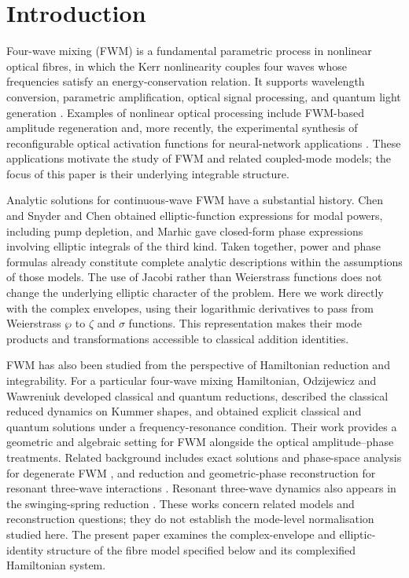 \documentclass[11pt,a4paper]{article}
\numberwithin{equation}{section}
\begin{document}
\section{Introduction}
Four-wave mixing (FWM) is a fundamental parametric process in nonlinear optical fibres, in which the Kerr nonlinearity couples four waves whose frequencies satisfy an energy-conservation relation.
It supports wavelength conversion, parametric amplification, optical signal processing, and quantum light generation \cite{agrawalNonlinearFiberOptics2019,marhicFiberOpticalParametric2007}.
Examples of nonlinear optical processing include FWM-based amplitude regeneration \cite{bottrillOptimisationAmplitudeLimiters2016} and, more recently, the experimental synthesis of reconfigurable optical activation functions for neural-network applications \cite{yangReconfigurableOpticalNonlinear2026}.
These applications motivate the study of FWM and related coupled-mode models; the focus of this paper is their underlying integrable structure.

Analytic solutions for continuous-wave FWM have a substantial history.
Chen and Snyder \cite{chenFourphotonParametricMixing1989} and Chen \cite{chenFourwaveMixingOptical1989} obtained elliptic-function expressions for modal powers, including pump depletion, and Marhic \cite{marhicAnalyticSolutionsPhases2013} gave closed-form phase expressions involving elliptic integrals of the third kind.
Taken together, power and phase formulas already constitute complete analytic descriptions within the assumptions of those models.
The use of Jacobi rather than Weierstrass functions does not change the underlying elliptic character of the problem.
Here we work directly with the complex envelopes, using their logarithmic derivatives to pass from Weierstrass $\wp$ to $\zeta$ and $\sigma$ functions.
This representation makes their mode products and transformations accessible to classical addition identities.

FWM has also been studied from the perspective of Hamiltonian reduction and integrability.
For a particular four-wave mixing Hamiltonian, Odzijewicz and Wawreniuk \cite{odzijewiczIntegrableClassicalQuantum2020} developed classical and quantum reductions, described the classical reduced dynamics on Kummer shapes, and obtained explicit classical and quantum solutions under a frequency-resonance condition.
Their work provides a geometric and algebraic setting for FWM alongside the optical amplitude--phase treatments.
Related background includes exact solutions and phase-space analysis for degenerate FWM \cite{cappelliniThirdorderThreewaveMixing1991}, and reduction and geometric-phase reconstruction for resonant three-wave interactions \cite{alberGeometricPhasesReduction1998}.
Resonant three-wave dynamics also appears in the swinging-spring reduction \cite{holmStepwisePrecessionResonant2002}.
These works concern related models and reconstruction questions; they do not establish the mode-level normalisation studied here.
The present paper examines the complex-envelope and elliptic-identity structure of the fibre model specified below and its complexified Hamiltonian system.
\end{document}
